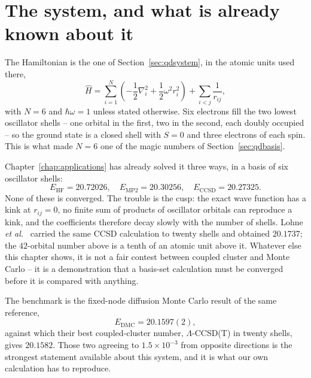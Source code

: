 \section{The system, and what is already known about it}
\label{sec:appsystem}

The Hamiltonian is the one of Section~\ref{sec:qdsystem}, in the atomic units
used there,
\begin{equation}
  \hat{H} = \sum_{i=1}^{N}\left(-\frac{1}{2}\nabla_i^2
    + \frac{1}{2}\omega^2 r_i^2\right)
    + \sum_{i<j}\frac{1}{r_{ij}} ,
  \label{eq:16-hamiltonian}
\end{equation}
with $N=6$ and $\hbar\omega=1$ unless stated otherwise.  Six electrons fill the
two lowest oscillator shells -- one orbital in the first, two in the second,
each doubly occupied -- so the ground state is a closed shell with $S=0$ and
three electrons of each spin.  This is what made $N=6$ one of the magic numbers
of Section~\ref{sec:qdbasis}.

Chapter~\ref{chap:applications} has already solved it three ways, in a basis of
six oscillator shells:
\begin{equation}
  E_{\mathrm{HF}} = 20.72026, \quad
  E_{\mathrm{MP2}} = 20.30256, \quad
  E_{\mathrm{CCSD}} = 20.27325 .
  \label{eq:16-basisresults}
\end{equation}
None of these is converged.  The trouble is the cusp: the exact wave function
has a kink at $r_{ij}=0$, no finite sum of products of oscillator orbitals can
reproduce a kink, and the coefficients therefore decay slowly with the number
of shells.  Lohne \emph{et al.}~\cite{lohne2011} carried the same CCSD
calculation to twenty shells and obtained $20.1737$; the $42$-orbital number
above is a tenth of an atomic unit above it.  Whatever else this chapter shows,
it is not a fair contest between coupled cluster and Monte Carlo -- it is a
demonstration that a basis-set calculation must be converged before it is
compared with anything.

The benchmark is the fixed-node diffusion Monte Carlo result of the same
reference,
\begin{equation}
  E_{\mathrm{DMC}} = 20.1597(2),
  \label{eq:16-benchmark}
\end{equation}
against which their best coupled-cluster number, $\Lambda$-CCSD(T) in twenty
shells, gives $20.1582$.  Those two agreeing to $1.5\times10^{-3}$ from
opposite directions is the strongest statement available about this system, and
it is what our own calculation has to reproduce.

